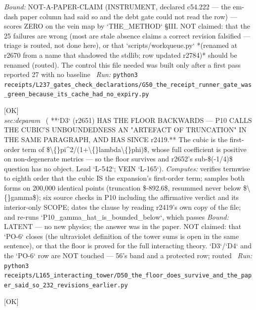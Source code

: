\begin{description}
 \emph{Bound:} NOT-A-PAPER-CLAIM (INSTRUMENT, declared c54.222 --- the em-dash paper column had said so and the debt gate could not read the row) --- scores ZERO on the vein map by `THE\_METHOD` \S{}III. NOT claimed: that the 25 failures are wrong (most are stale absence claims a correct revision falsified --- triage is routed, not done here), or that `scripts/workqueue.py` *(renamed at r2670 from a name that shadowed the stdlib; row updated r2784)* should be renamed (routed).  The control this file needed was built only after a first pass reported 27 with no baseline
\ \emph{Run:} \texttt{python3 receipts/L237\_gates\_check\_declarations/G50\_the\_receipt\_runner\_gate\_was\_green\_because\_its\_cache\_had\_no\_expiry.py}
\item[\label{rcpt:D50_the_floor_does_survive_and_the_paper_said_so_232_revisions_earlier}\texttt{D50\_the\_floor\_does\_survive\_and\_the\_paper\_said\_so\_232\_revisions\_earlier}]\hfill\textsf{[OK]}\\
\textit{sec:deparam} \ ( **`D3` (r2651) HAS THE FLOOR BACKWARDS --- P10 CALLS THE CUBIC'S UNBOUNDEDNESS AN "ARTEFACT OF TRUNCATION" IN THE SAME PARAGRAPH, AND HAS SINCE r2419.** The cubic is the first-order term of \$\textbackslash\{\}pi\textasciicircum{}2/(1+\textbackslash\{\}lambda\textbackslash\{\}phi)\$, whose full coefficient is positive on non-degenerate metrics --- so the floor survives and r2652's sub-\$(-1/4)\$ question has no object. Lead `L-542`; VEIN `L-165`). 
\emph{Computes:} verifies termwise to eighth order that the cubic IS the expansion's first-order term; samples both forms on 200,000 identical points (truncation \$-892.6\$, resummed never below \$\textbackslash\{\}gamma\$); six source checks in P10 including the affirmative verdict and its interior-only SCOPE; dates the clause by reading r2419's own copy of the file; and re-runs `P10\_gamma\_hat\_is\_bounded\_below`, which passes
 \emph{Bound:} LATENT --- no new physics; the answer was in the paper. NOT claimed: that `PO-6` closes (the ultraviolet definition of the tower sums is open in the same sentence), or that the floor is proved for the full interacting theory.  `D3`/`D4` and the `PO-6` row are NOT touched --- 56's band and a protected row; routed
\ \emph{Run:} \texttt{python3 receipts/L165\_interacting\_tower/D50\_the\_floor\_does\_survive\_and\_the\_paper\_said\_so\_232\_revisions\_earlier.py}
\item[\label{rcpt:B19_the_swap_is_the_weyl_z2_not_the_centre}\texttt{B19\_the\_swap\_is\_the\_weyl\_z2\_not\_the\_centre}]\hfill\textsf{[OK]}\\

\end{description}
